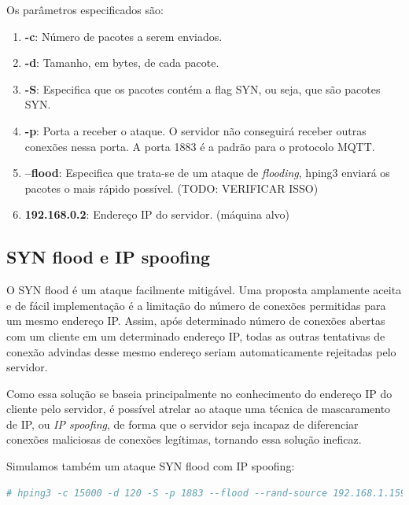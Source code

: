 Os parâmetros especificados são:

\begin{enumerate}
    \item \textbf{-c}: Número de pacotes a serem enviados.
    \item \textbf{-d}: Tamanho, em bytes, de cada pacote.
    \item \textbf{-S}: Especifica que os pacotes contém a flag SYN, ou seja, que são pacotes SYN.
    \item \textbf{-p}: Porta a receber o ataque. O servidor não conseguirá receber outras conexões nessa porta. A porta 1883 é a padrão para o protocolo MQTT.
    \item \textbf{--flood}: Especifica que trata-se de um ataque de \emph{flooding}, hping3 enviará os pacotes o mais rápido possível. (TODO: VERIFICAR ISSO)
    \item \textbf{192.168.0.2}: Endereço IP do servidor. (máquina alvo)
\end{enumerate}






\subsection{SYN flood e IP spoofing}

O SYN flood é um ataque facilmente mitigável. Uma proposta amplamente aceita e de fácil implementação é a limitação do número de conexões permitidas para um mesmo endereço IP. Assim, após determinado número de conexões abertas com um cliente em um determinado endereço IP, todas as outras tentativas de conexão advindas desse mesmo endereço seriam automaticamente rejeitadas pelo servidor.

Como essa solução se baseia principalmente no conhecimento do endereço IP do cliente pelo servidor, é possível atrelar ao ataque uma técnica de mascaramento de IP, ou \emph{IP spoofing}, de forma que o servidor seja incapaz de diferenciar conexões maliciosas de conexões legítimas, tornando essa solução ineficaz.



Simulamos também um ataque SYN flood com IP spoofing:

\begin{lstlisting}[language=bash, caption={SYN Flood com IP spoofing}, label={lst:hping}]
# hping3 -c 15000 -d 120 -S -p 1883 --flood --rand-source 192.168.1.159
\end{lstlisting}

